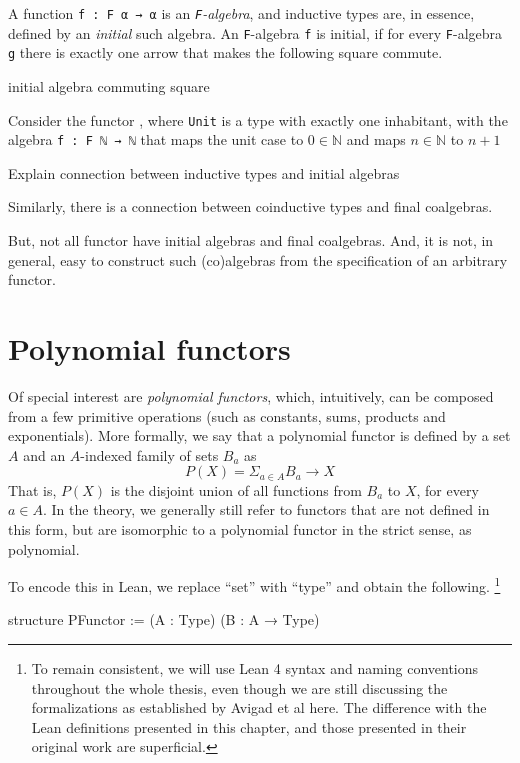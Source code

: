 \documentclass[titlepage]{report}
\newenvironment{todo}{\begin{shaded}\begin{trivlist}                         
    \item[\hskip \labelsep {\bfseries Todo:}]}{\end{trivlist}\end{shaded}}
\begin{document}
A function \texttt{f : F α → α} is an \emph{\texttt{F}-algebra}, and inductive types are, in essence, defined by an \emph{initial} such algebra. An \texttt{F}-algebra \texttt{f} is initial, if for every \texttt{F}-algebra \texttt{g} there is exactly one arrow that makes the following square commute.
\begin{todo}
    initial algebra commuting square
\end{todo}

Consider the functor , where \texttt{Unit} is a type with exactly one inhabitant, with the algebra \texttt{f : F ℕ → ℕ} that maps the unit case to $0 ∈ \mathbb{N}$ and maps $n ∈ ℕ$ to $n + 1$

\begin{todo}
    Explain connection between inductive types and initial algebras
\end{todo}

Similarly, there is a connection between coinductive types and final coalgebras.

But, not all functor have initial algebras and final coalgebras. And, it is not, in general, easy to construct such (co)algebras from the specification of an arbitrary functor.


\section{Polynomial functors}
Of special interest are \emph{polynomial functors}, which, intuitively, can be composed from a few primitive operations (such as constants, sums, products and exponentials).
More formally, we say that a polynomial functor is defined by a set $A$ and an $A$-indexed family of sets $B_a$ as
\[
    P(X) = \Sigma_{a ∈ A} B_a \rightarrow X  
\]
That is, $P(X)$ is the disjoint union of all functions from $B_a$ to $X$, for every $a ∈ A$.
In the theory, we generally still refer to functors that are not defined in this form, but are isomorphic to a polynomial functor in the strict sense, as polynomial.

To encode this in Lean, we replace ``set'' with ``type'' and obtain the following.
\footnote{To remain consistent, we will use Lean 4 syntax and naming conventions throughout the whole thesis, even though we are still discussing the formalizations as established by Avigad et al here. The difference with the Lean definitions presented in this chapter, and those presented in their original work are superficial.}
\begin{leancode}
    structure PFunctor := (A : Type) (B : A → Type)
\end{leancode}
\end{document}
